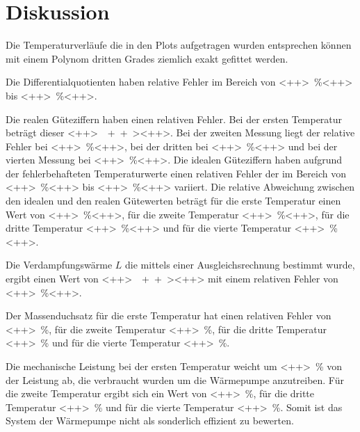 \section{Diskussion}
\label{sec:Diskussion}

Die Temperaturverläufe die in den Plots aufgetragen wurden entsprechen können mit einem Polynom dritten Grades ziemlich exakt gefittet werden. 

Die Differentialquotienten haben relative Fehler im Bereich von \SI{<++>}{\percent}<++> bis \SI{<++>}{\percent}<++>. 

Die realen Güteziffern haben einen relativen Fehler. Bei der ersten Temperatur beträgt dieser \SI{<++>}{\<++>}<++>. Bei der zweiten Messung liegt der relative Fehler bei \SI{<++>}{\percent}<++>, bei der dritten bei \SI{<++>}{\percent}<++> und bei der vierten Messung bei \SI{<++>}{\percent}<++>. 
Die idealen Güteziffern haben aufgrund der fehlerbehafteten Temperaturwerte einen relativen Fehler der im Bereich von \SI{<++>}{\percent}<++> bis \SI{<++>}{\percent}<++> variiert. 
Die relative Abweichung zwischen den idealen und den realen Gütewerten beträgt für die erste Temperatur einen Wert von \SI{<++>}{\percent}<++>, für die zweite Temperatur \SI{<++>}{\percent}<++>, für die dritte Temperatur \SI{<++>}{\percent}<++> und für die vierte Temperatur \SI{<++>}{\percent}<++>.

\noindent Die Verdampfungswärme $L$ die mittels einer Ausgleichsrechnung bestimmt wurde, ergibt einen Wert von \SI{<++>}{\<++>}<++> mit einem relativen Fehler von \SI{<++>}{\percent}<++>. 

\noindent Der Massenduchsatz für die erste Temperatur hat einen relativen Fehler von \SI{<++>}{\percent}, für die zweite Temperatur \SI{<++>}{\percent}, für die dritte Temperatur \SI{<++>}{\percent} und für die vierte Temperatur \SI{<++>}{\percent}. 

\noindent Die mechanische Leistung bei der ersten Temperatur weicht um \SI{<++>}{\percent} von der Leistung ab, die verbraucht wurden um die Wärmepumpe anzutreiben. Für die zweite Temperatur ergibt sich ein Wert von \SI{<++>}{\percent}, für die dritte Temperatur \SI{<++>}{\percent} und für die vierte Temperatur \SI{<++>}{\percent}. 
Somit ist das System der Wärmepumpe nicht als sonderlich effizient zu bewerten. 
